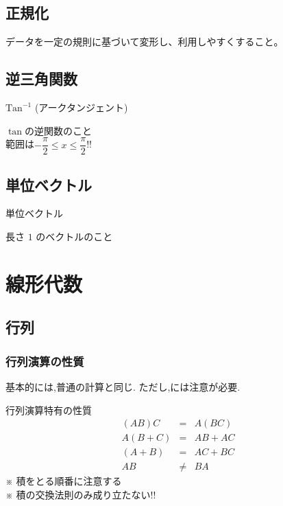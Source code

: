 \documentclass[a4paper]{jsarticle}
\begin{document}
\subsection{正規化}
データを一定の規則に基づいて変形し、利用しやすくすること。
\subsection{逆三角関数}
\begin{itembox}[l]{$\mathrm{Tan}^{-1}$ (アークタンジェント)}
    \begin{center}
        $\tan$の逆関数のこと\\
        範囲は$-\dfrac{\pi}{2}\leq x \leq\dfrac{\pi}{2}$!!
    \end{center}
\end{itembox}
\subsection{単位ベクトル}
\begin{itembox}[l]{単位ベクトル}
    \begin{center}
        長さ $1$ のベクトルのこと
    \end{center}
\end{itembox}
\newpage
\section{線形代数}
\subsection{行列}
\subsubsection{行列演算の性質}
基本的には,普通の計算と同じ.
ただし,には注意が必要.
\begin{itembox}[l]{行列演算特有の性質}
    \begin{eqnarray*}
        \left(AB\right)C&=&A\left(BC\right)\\
        A\left(B+C\right)&=&AB+AC\\
        \left(A+B\right)&=&AC+BC\\
        AB&\neq& BA
    \end{eqnarray*}
    ※ 積をとる順番に注意する\\
    ※ 積の交換法則のみ成り立たない!!
\end{itembox}
\end{document}
